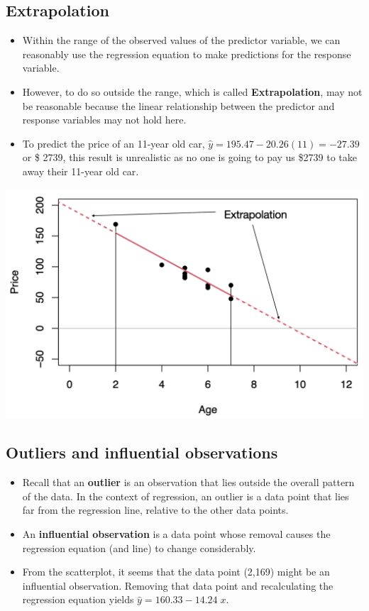 \documentclass[
]{article}
\begin{document}
\hypertarget{extrapolation}{%
\subsection{Extrapolation}\label{extrapolation}}

\begin{itemize}
\item
  Within the range of the observed values of the predictor variable, we
  can reasonably use the regression equation to make predictions for the
  response variable.
\item
  However, to do so outside the range, which is called
  \textbf{Extrapolation}, may not be reasonable because the linear
  relationship between the predictor and response variables may not hold
  here.
\item
  To predict the price of an 11-year old car,
  \(\hat{y}=195.47-20.26 (11)=-27.39\) or \$ 2739, this result is
  unrealistic as no one is going to pay us \$2739 to take away their
  11-year old car.
\end{itemize}

\begin{center}\includegraphics[width=0.6\linewidth,height=0.6\textheight]{figures/extrap} \end{center}

\hypertarget{outliers-and-influential-observations}{%
\subsection{Outliers and influential
observations}\label{outliers-and-influential-observations}}

\begin{itemize}
\item
  Recall that an \textbf{outlier} is an observation that lies outside
  the overall pattern of the data. In the context of regression, an
  outlier is a data point that lies far from the regression line,
  relative to the other data points.
\item
  An \textbf{influential observation} is a data point whose removal
  causes the regression equation (and line) to change considerably.
\item
  From the scatterplot, it seems that the data point (2,169) might be an
  influential observation. Removing that data point and recalculating
  the regression equation yields \(\hat{y}=160.33-14.24\;x\).
\end{itemize}
\end{document}
